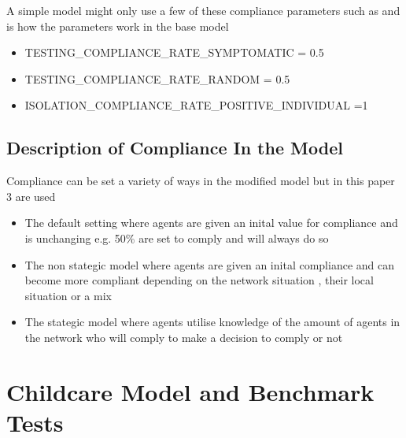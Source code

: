 \documentclass{article}
\begin{document}
A simple model might only use a few of these compliance parameters such as  and is how the parameters work in the base model
\begin{itemize}
\item TESTING\_COMPLIANCE\_RATE\_SYMPTOMATIC = 0.5\
\item TESTING\_COMPLIANCE\_RATE\_RANDOM = 0.5
\item ISOLATION\_COMPLIANCE\_RATE\_POSITIVE\_INDIVIDUAL =1
\end{itemize}


\subsection{Description of Compliance In the Model}
Compliance can be set a variety of ways in the modified model but in this paper 3 are used
\begin{itemize}
\item The default setting where agents are given an inital value for compliance and is unchanging e.g. 50\% are set to comply and will always do so
\item The non stategic model where agents are given an inital compliance and can become more compliant depending on the network situation , their local situation or a mix
\item The stategic model where agents utilise knowledge of the amount of agents in the network who will comply to make a decision to comply or not
\end{itemize}



\section{Childcare Model and Benchmark Tests}
\end{document}
